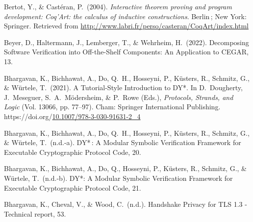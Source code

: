 \documentclass[12pt,twoside]{article}
\begin{document}
{\begin{thebibliography}{1079}
\mdbibitemlabel{}Bertot, Y., \& Castéran, P.~(2004). \emph{Interactive theorem proving and program development: Coq’Art: the calculus of inductive constructions}. Berlin ; New York: Springer. Retrieved from \href{http://www.labri.fr/perso/casteran/CoqArt/index.html}{{\ttfamily http://\hspace{0pt}www.\hspace{0pt}labri.\hspace{0pt}fr/\hspace{0pt}perso/\hspace{0pt}casteran/\hspace{0pt}CoqArt/\hspace{0pt}index.\hspace{0pt}html}}%

\mdbibitemlabel{}Beyer, D., Haltermann, J., Lemberger, T., \& Wehrheim, H.~(2022). Decomposing Software Verification into Off-the-Shelf Components: An Application to CEGAR, 13.%

\mdbibitemlabel{}Bhargavan, K., Bichhawat, A., Do, Q.~H., Hosseyni, P., Küsters, R., Schmitz, G., \& Würtele, T.~(2021). A Tutorial-Style Introduction to DY*. In D.~Dougherty, J.~Meseguer, S.~A.~Mödersheim, \& P.~Rowe (Eds.), \emph{Protocols, Strands, and Logic} (Vol. 13066, pp. 77–97). Cham: Springer International Publishing. https://doi.org/\href{https://dx.doi.org/10.1007/978-3-030-91631-2_4}{10.1007/978-3-030-91631-2\_4}%

\mdbibitemlabel{}Bhargavan, K., Bichhawat, A., Do, Q.~H., Hosseyni, P., Küsters, R., Schmitz, G., \& Würtele, T.~(n.d.-a). DY* : A Modular Symbolic Veriﬁcation Framework for Executable Cryptographic Protocol Code, 20.%

\mdbibitemlabel{}Bhargavan, K., Bichhawat, A., Do, Q., Hosseyni, P., Küsters, R., Schmitz, G., \& Würtele, T.~(n.d.-b). DY*: A Modular Symbolic Verification Framework for Executable Cryptographic Protocol Code, 21.%

\mdbibitemlabel{}Bhargavan, K., Cheval, V., \& Wood, C.~(n.d.). Handshake Privacy for TLS 1.3 - Technical report, 53.%


\end{thebibliography}}
\end{document}
